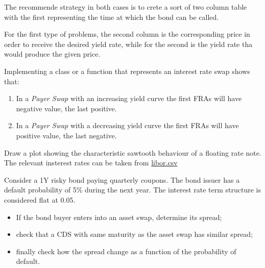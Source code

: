 \documentclass[12pt,a4paper]{book}
\begin{document}
The recommende strategy in both cases is to crete a sort of two column table with the first representing the time at which the bond can be called.

For the first type of problems, the second column is the corresponding price in order to receive the desired yield rate, %
while for the second is the yield rate tha would produce the given price. %


\begin{question}[subtitle=IRS as FRA sum (\texttt{python})]
Implementing a class or a function that represents an interest rate swap shows that:
\begin{enumerate}
\item In a \emph{Payer Swap} with an increasing yield curve the first FRAs will have negative value, the last positive. 
\item In a \emph{Payer Swap} with a decreasing yield curve the first FRAs will have positive value, the last negative.
\end{enumerate}
\end{question}

\begin{question}[subtitle=FRN resetting (\texttt{python})]
Draw a plot showing the characteristic sawtooth behaviour of a floating rate note. The relevant insterest rates can be taken from \href{https://raw.githubusercontent.com/matteosan1/advanced\_financial\_modeling/master/input_files/libor.csv}{libor.csv}
	
\end{question}

\begin{question}[subtitle=Asset Swap vs CDS (\texttt{python})]
Consider a 1Y risky bond paying quarterly coupons. The bond issuer has a default probability of 5\% during the next year. The interest rate term structure is considered flat at 0.05.

\begin{itemize}
\item If the bond buyer enters into an asset swap, determine its spread;
\item check that a CDS with same maturity as the asset swap has similar spread;
\item finally check how the spread change as a function of the probability of default.
\end{itemize}
\end{question}
\end{document}
